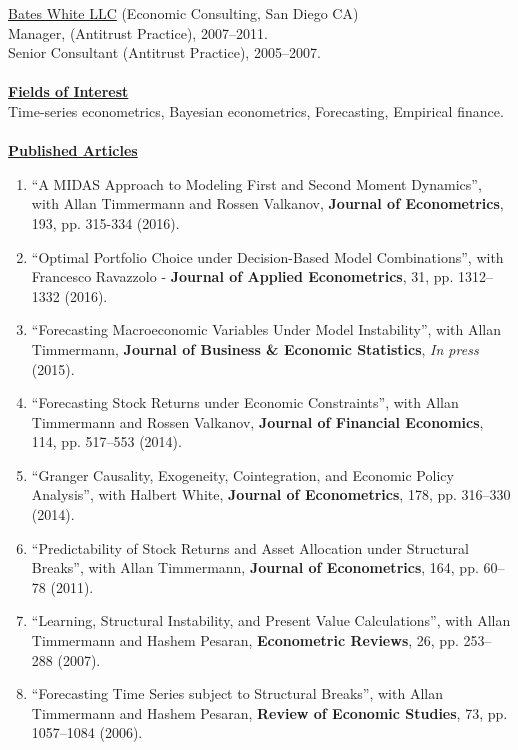 \documentclass[12pt]{article}
\begin{document}
\underline{Bates White LLC} (Economic Consulting, San Diego CA)\\
Manager, (Antitrust Practice), 2007--2011.\\
Senior Consultant (Antitrust Practice), 2005--2007. \\ \\
\underline{\textbf{Fields of Interest}}\\
Time-series econometrics, Bayesian econometrics, Forecasting, Empirical finance.\\ \\
\underline{\textbf{Published Articles}}
\begin{enumerate}	

	\item ``A MIDAS Approach to Modeling First and Second Moment Dynamics'', with Allan Timmermann and Rossen Valkanov, \textbf{Journal of Econometrics}, 193, pp. 315-334 (2016).
	\item ``Optimal Portfolio Choice under Decision-Based Model Combinations'', with Francesco Ravazzolo - \textbf{Journal of Applied Econometrics}, 31, pp. 1312--1332 (2016).
	  \item ``Forecasting Macroeconomic Variables Under Model Instability'', with Allan Timmermann, \textbf{Journal of Business \& Economic Statistics},  \textit{In press} (2015). 
	\item ``Forecasting Stock Returns under Economic Constraints'', with Allan Timmermann and Rossen Valkanov, \textbf{Journal of Financial Economics}, 114, pp. 517--553 (2014). 
	\item ``Granger Causality, Exogeneity, Cointegration, and Economic Policy Analysis'', with Halbert White, \textbf{Journal of Econometrics}, 178, pp. 316--330 (2014). 
	\item ``Predictability of Stock Returns and Asset Allocation under Structural Breaks'', with Allan Timmermann, \textbf{Journal of Econometrics}, 164, pp. 60--78 (2011). 
	\item ``Learning, Structural Instability, and Present Value Calculations'', with Allan Timmermann and Hashem Pesaran, \textbf{Econometric Reviews}, 26, pp. 253--288 (2007). 
	\item ``Forecasting Time Series subject to Structural Breaks'', with Allan Timmermann and Hashem Pesaran, \textbf{Review of Economic Studies}, 73, pp. 1057--1084 (2006). 

    \setcounter{enumTemp}{\theenumi}
 \end{enumerate}
\end{document}
